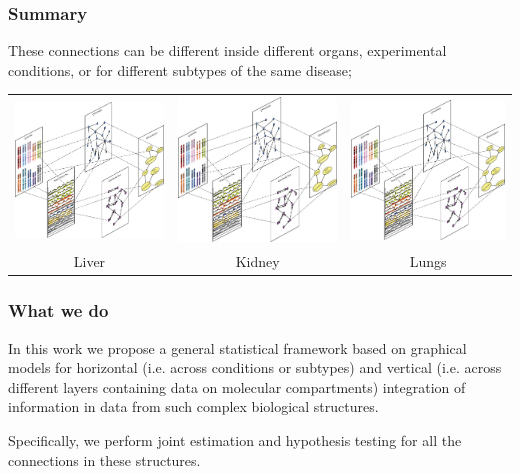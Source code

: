 \documentclass[10pt]{beamer}
\theoremstyle{definition}
\begin{document}
\begin{frame}
\frametitle{Summary}

These connections can be different inside different organs, experimental conditions, or for different subtypes of the same disease;

\begin{center}
\begin{scriptsize}
\begin{tabular}{ccc}
\includegraphics[width=.3\textwidth,angle=-90]{data_integration_schematic}\vspace{.5em}
& \includegraphics[width=.3\textwidth,angle=-90]{data_integration_schematic}\vspace{.5em}
& \includegraphics[width=.3\textwidth,angle=-90]{data_integration_schematic}\vspace{.5em}\\
Liver & Kidney & Lungs\\
\end{tabular}
\end{scriptsize}
\end{center}
\end{frame}

\begin{frame}
\frametitle{What we do}
In this work we propose a general statistical framework based on graphical models for horizontal (i.e. across conditions or subtypes) and vertical (i.e. across different layers containing data on molecular compartments) integration of information in data from such complex biological structures.

\vspace{1em}
Specifically, we perform {\colbit joint estimation and hypothesis testing} for all the connections in these structures.

\end{frame}
\end{document}
